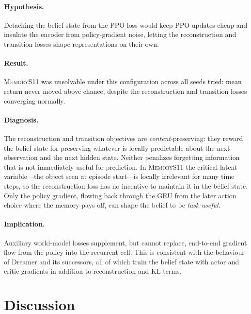 \documentclass[letterpaper]{article}
\begin{document}
\paragraph{Hypothesis.} Detaching the belief state from the PPO loss
would keep PPO updates cheap and insulate the encoder from policy-gradient
noise, letting the reconstruction and transition losses shape
representations on their own.

\paragraph{Result.} \textsc{MemoryS11} was unsolvable under this
configuration across all seeds tried: mean return never moved above chance,
despite the reconstruction and transition losses converging normally.

\paragraph{Diagnosis.} The reconstruction and transition objectives are
\emph{content}-preserving: they reward the belief state for preserving
whatever is locally predictable about the next observation and the next
hidden state. Neither penalizes forgetting information that is not
immediately useful for prediction. In \textsc{MemoryS11} the critical
latent variable---the object seen at episode start---is locally irrelevant
for many time steps, so the reconstruction loss has no incentive to
maintain it in the belief state. Only the policy gradient, flowing back
through the GRU from the later action choice where the memory pays off,
can shape the belief to be \emph{task-useful}.

\paragraph{Implication.} Auxiliary world-model losses supplement, but
cannot replace, end-to-end gradient flow from the policy into the
recurrent cell. This is consistent with the behaviour of Dreamer and its
successors, all of which train the belief state with actor and critic
gradients in addition to reconstruction and KL terms.

\section{Discussion}
\label{sec:discussion}
\end{document}
